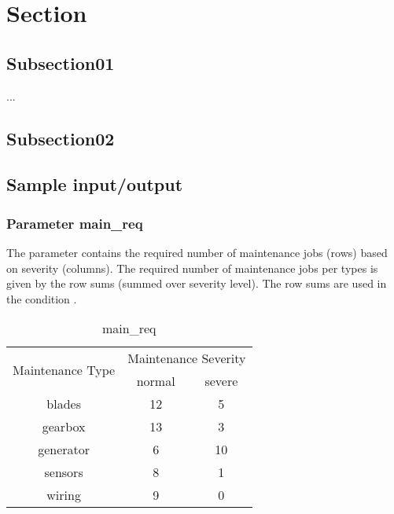 \section{Section}
    \subsection{Subsection01}
    ...

    \subsection{Subsection02}

    \subsection{Sample input/output}
        \subsubsection{Parameter main\_req}
        The parameter contains the required number of maintenance jobs (rows) based on severity 
        (columns). The required number of maintenance jobs per types is given by the row sums 
        (summed over severity level). The row sums are used in the condition .
        \begin{table}[H]
            \begin{center}
                \begin{tabular}{ |c|c|c| } 
                \hline
                \multirow{2}{*}{Maintenance Type} &
                \multicolumn{2}{|c|}{Maintenance Severity}\\
                \cline{2-2}\cline{3-3}
                & normal & severe \\ 
                \hline
                blades    & 12 & 5  \\ 
                gearbox   & 13 & 3  \\ 
                generator & 6  & 10 \\ 
                sensors   & 8  & 1  \\ 
                wiring    & 9  & 0  \\ 
                \hline
                \end{tabular}
            \end{center}
        \caption{main\_req} %
        \label{param_main_req} %
        \end{table}

